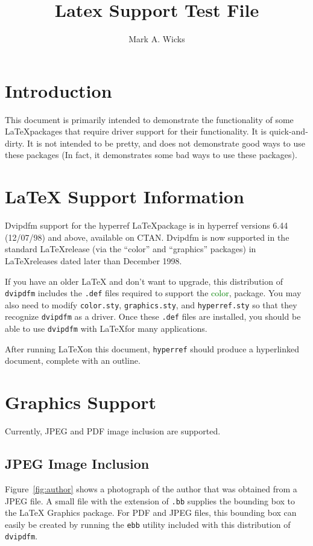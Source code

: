 \documentclass{article}
\title{\color{blue}Latex Support Test File}
\author{\color{green}Mark A. Wicks}
\begin{document}
\maketitle
\section{Introduction}
This document is primarily intended
to demonstrate the functionality
of some \LaTeX packages that require
driver support for their functionality.
It is quick-and-dirty.
It is not intended to be pretty, and
does not demonstrate good ways to use these packages
(In fact, it demonstrates some bad ways to use these packages).

\section{LaTeX Support Information}
Dvipdfm support for the hyperref \LaTeX\space package is 
in hyperref versions 6.44 (12/07/98) and above, available on CTAN.
Dvipdfm is now supported in the
standard \LaTeX\space release (via the ``color'' and ``graphics'' packages) in
\LaTeX\space releases dated later than December 1998.

If you have an older LaTeX and don't want to upgrade,
this distribution of {\tt dvipdfm} includes
the {\tt .def} files required to support
the \textcolor{green}{color},
 package.
You may also need to modify {\tt color.sty}, {\tt graphics.sty},
and {\tt hyperref.sty} so that they
recognize {\tt dvipdfm} as a driver.
Once these {\tt .def} files are installed,
you should be able to use {\tt dvipdfm}
with \LaTeX for many applications.

After running \LaTeX on this
document, {\tt hyperref}
should produce a hyperlinked
document, complete with an outline.

\newpage
\section{Graphics Support}
Currently, JPEG and PDF image
inclusion are supported.

\subsection{JPEG Image Inclusion}
Figure~\ref{fig:author}
shows a photograph of the author
that was obtained from a JPEG file.
A small file with the extension of {\tt .bb}
supplies the bounding box to the \LaTeX\space
Graphics package.  For PDF and JPEG files,
this bounding box can easily be created by running
the {\tt ebb} utility included with this
distribution of {\tt dvipdfm}.
\end{document}
